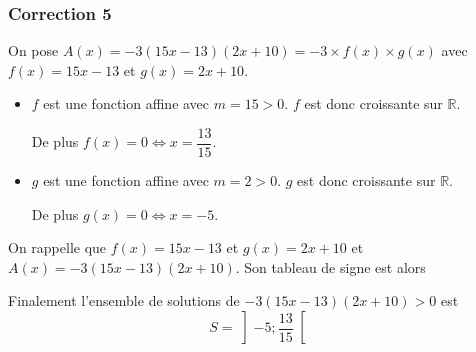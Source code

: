 \documentclass[15pt, mathserif]{beamer}
\begin{document}
\begin{frame}
\vspace{-10mm}
	\frametitle{Correction 5}
On pose $A(x) = -3(15x-13)(2x+10) = -3\times f(x) \times g(x)$ avec $f(x) = 15x-13$ et $g(x) = 2x+10$.

\begin{itemize}
	\item $f$ est une fonction affine avec $m =15>0$. $f$ est donc croissante sur $\mathbb{R}$.

	 De plus $f(x) = 0 \Leftrightarrow x = \dfrac{13}{15}$.
	\item $g$ est une fonction affine avec $m =2>0$. $g$ est donc croissante sur $\mathbb{R}$.

	 De plus $g(x) = 0 \Leftrightarrow x = -5$.
\end{itemize}

 \end{frame}


\begin{frame}On rappelle que $f(x) = 15x-13$ et $g(x) = 2x+10$ et $A(x) = -3(15x-13)(2x+10)$. Son tableau de signe est alors 

\medskip \hfil
{}

 Finalement l'ensemble de solutions de $-3(15x-13)(2x+10)>0$ est\[S = \left]-5;\dfrac{13}{15}\right[\]

\end{frame}
\end{document}
